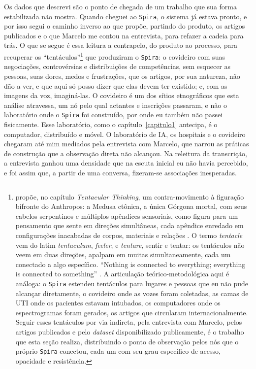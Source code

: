 Os dados que descrevi são o ponto de chegada de um trabalho que sua forma estabilizada não mostra. Quando cheguei ao \texttt{Spira}, o sistema já estava pronto, e por isso segui o caminho inverso ao que \textcite{Latour2011CienciaEmAcao} propõe, partindo do produto, os artigos publicados e o que Marcelo me contou na entrevista, para refazer a cadeia para trás. O que se segue é essa leitura a contrapelo, do produto ao processo, para recuperar os \enquote{tentáculos}\footnote{\textcite{Haraway2016Staying} propõe, no capítulo \textit{Tentacular Thinking}, um contra-movimento à figuração bifronte do Anthropos: a Medusa ctônica, a única Górgona mortal, com seus cabelos serpentinos e múltiplos apêndices sensoriais, como figura para um pensamento que sente em direções simultâneas, cada apêndice enredado em configurações inacabadas de corpos, materiais e relações \parencite[p.~31]{Haraway2016Staying}. O termo \textit{tentacle} vem do latim \textit{tentaculum}, \textit{feeler}, e \textit{tentare}, sentir e tentar: os tentáculos não veem em duas direções, apalpam em muitas simultaneamente, cada um conectado a algo específico. \enquote{Nothing is connected to everything; everything is connected to something} \parencite[p.~31]{Haraway2016Staying}. A articulação teórico-metodológica aqui é análoga: o \texttt{Spira} estendeu tentáculos para lugares e pessoas que eu não pude alcançar diretamente, o covideiro onde as vozes foram coletadas, as camas de UTI onde os pacientes estavam intubados, os computadores onde os espectrogramas foram gerados, os artigos que circularam internacionalmente. Seguir esses tentáculos por via indireta, pela entrevista com Marcelo, pelos artigos publicados e pelo \textit{dataset} disponibilizado publicamente, é o trabalho que esta seção realiza, distribuindo o ponto de observação pelos nós que o próprio \texttt{Spira} conectou, cada um com seu grau específico de acesso, opacidade e resistência.} que produziram o \texttt{Spira}: o covideiro com suas negociações, controvérsias e distribuições de competências, sem esquecer as pessoas, suas dores, medos e frustrações, que os artigos, por sua natureza, não dão a ver, e que aqui só posso dizer que elas devem ter existido; e, com as imagens da voz, imaginá-las. O covideiro é um dos sítios etnográficos que esta análise atravessa, um nó pelo qual actantes e inscrições passaram, e não o laboratório onde o \texttt{Spira} foi construído, por onde eu também não passei fisicamente. Esse laboratório, como o capítulo~\ref{capitulo1} antecipa, é o computador, distribuído e móvel. O laboratório de IA, os hospitais e o covideiro chegaram até mim mediados pela entrevista com Marcelo, que narrou as práticas de construção que a observação direta não alcançou. Na releitura da transcrição, a entrevista ganhou uma densidade que na escuta inicial eu não havia percebido, e foi assim que, a partir de uma conversa, fizeram-se associações inesperadas.

